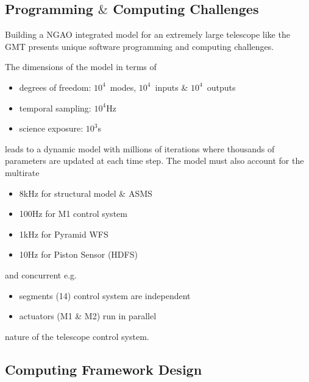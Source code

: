 \documentclass[]{AO4ELT}  %
\begin{document}
\subsection{Programming $\&$ Computing Challenges}
\label{sec:pc-challenge}

Building a NGAO integrated model for an extremely large telescope like the GMT presents unique software programming and computing challenges.

The dimensions of the model in terms of
\begin{itemize}
   \item degrees of freedom: $10^4$~modes, $10^4$~inputs \& $10^4$~outputs
   \item temporal sampling: $10^4$Hz
   \item science exposure: $10^3$s
\end{itemize}
leads to a dynamic model with millions of iterations where thousands of parameters are updated at each time step.
The model must also account for the multirate
\begin{itemize}
   \item 8kHz for structural model \& ASMS
   \item 100Hz for M1 control system
   \item 1kHz for Pyramid WFS
   \item 10Hz for Piston Sensor (HDFS)
\end{itemize}
and concurrent e.g.
\begin{itemize}
   \item segments (14) control system are independent
   \item actuators (M1 \& M2) run in parallel
\end{itemize}
nature of the telescope control system.

\subsection{Computing Framework Design}
\label{sec:framework-design}
\end{document}
